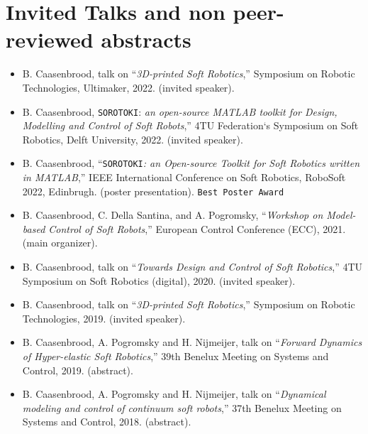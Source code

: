 \section*{Invited Talks and non peer-reviewed abstracts}
\begin{itemize}[leftmargin=4mm]
\item B. Caasenbrood, talk on  “\textit{3D-printed Soft Robotics},” Symposium on Robotic Technologies, Ultimaker, 2022. (invited speaker).
\item B. Caasenbrood, \texttt{SOROTOKI}: \textit{an open-source MATLAB toolkit for Design, Modelling and Control of Soft Robots},”   4TU Federation`s Symposium on Soft Robotics, Delft University, 2022. (invited speaker).
\item B. Caasenbrood, “\texttt{SOROTOKI}\textit{: an Open-source Toolkit for Soft Robotics written in MATLAB},”  IEEE International Conference on Soft Robotics, RoboSoft 2022, Edinbrugh. (poster presentation). \texttt{Best Poster Award}
\item B. Caasenbrood, C. Della Santina, and A. Pogromsky, “\textit{Workshop on Model-based Control of Soft Robots},” European Control Conference (ECC), 2021. (main organizer).
\item B. Caasenbrood, talk on  “\textit{Towards Design and Control of Soft Robotics},” 4TU Symposium on Soft Robotics (digital), 2020. (invited speaker).
\item B. Caasenbrood, talk on  “\textit{3D-printed Soft Robotics},” Symposium on Robotic Technologies, 2019. (invited speaker).
\item B. Caasenbrood, A. Pogromsky and H. Nijmeijer, talk on  “\textit{Forward Dynamics of Hyper-elastic Soft Robotics},” 39th Benelux Meeting on Systems and Control, 2019. (abstract).
\item B. Caasenbrood, A. Pogromsky and H. Nijmeijer, talk on  “\textit{Dynamical modeling and control of continuum soft robots},” 37th Benelux Meeting on Systems and Control, 2018. (abstract).
\end{itemize}
